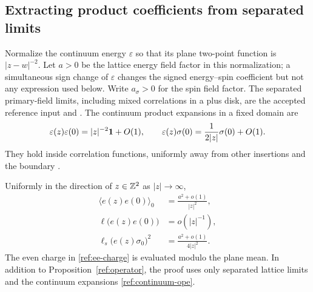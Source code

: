 \subsection{Extracting product coefficients from separated limits}

Normalize the continuum energy $\varepsilon$ so that its plane two-point
function is $|z-w|^{-2}$.  Let $a>0$ be the lattice energy field factor in
this normalization; a simultaneous sign change of $\varepsilon$ changes
the signed energy--spin coefficient but not any expression used below.
Write $a_\sigma>0$ for the spin field factor.  The separated primary-field
limits, including mixed correlations in a plus disk, are the accepted
reference input and \cite[Theorem~1.3]{CHI2023}.  The continuum product
expansions in a fixed domain are
\begin{equation}\label{ref:continuum-ope}
 \varepsilon(z)\varepsilon(0)=|z|^{-2}\mathbf 1+O(1),
 \qquad
 \varepsilon(z)\sigma(0)
       =\frac{1}{2|z|}\sigma(0)+O(1).
\end{equation}
They hold inside correlation functions, uniformly away from other
insertions and the boundary
\cite[Theorems~6.1--6.2 and Remark~6.4]{CHI2023}.

\begin{lemma}\label{ref:ope}
Uniformly in the direction of $z\in\mathbb Z^2$ as $|z|\to\infty$,
\begin{align}
 \langle e(z)e(0)\rangle_0
       &=\frac{a^2+o(1)}{|z|^2},\label{ref:ee-correlation}\\
 \ell\bigl(e(z)e(0)\bigr)&=o(|z|^{-1}),\label{ref:ee-charge}\\
 \ell_s\bigl(e(z)\sigma_0\bigr)^2
       &=\frac{a^2+o(1)}{4|z|^2}.\label{ref:es-charge}
\end{align}
The even charge in \eqref{ref:ee-charge} is evaluated modulo the plane mean.
In addition to Proposition~\ref{ref:operator}, the proof uses only separated
lattice limits and the continuum expansions \eqref{ref:continuum-ope}.
\end{lemma}

